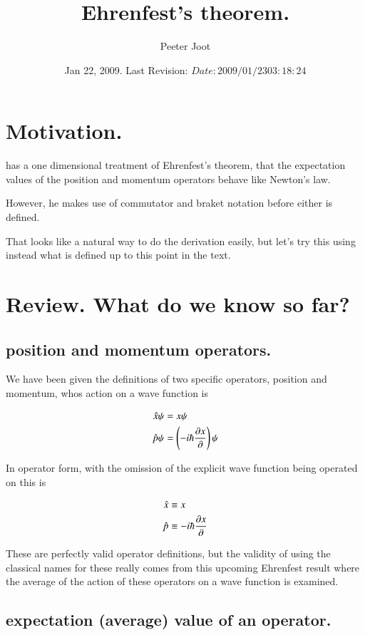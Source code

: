 \documentclass{article}
\title{ Ehrenfest's theorem. }
\author{Peeter Joot}
\date{ Jan 22, 2009.  Last Revision: $Date: 2009/01/23 03:18:24 $ }
\begin{document}
\maketitle{}

\section{ Motivation. }

\cite{mcmahon2005qmd} has a one dimensional treatment of Ehrenfest's theorem,
that the expectation values of the position and momentum operators behave
like Newton's law.

However, he makes use
of commutator and braket notation before either is defined.

That looks like a natural way to do the derivation easily, but let's try
this using instead what is defined up to this point in the text.

\section{ Review.  What do we know so far? }

\subsection{ position and momentum operators. }

We have been given the definitions of two specific operators, position and momentum, 
whos action on a wave function is

\begin{align*}
\hat{x} \psi &= x \psi \\
\hat{p} \psi &= \left(-i \hbar \frac{\partial{x}}{\partial {}}\right) \psi
\end{align*}

In operator form, with the omission of the explicit wave function being operated on this is

\begin{align*}
\hat{x} &\equiv x  \\
\hat{p} &\equiv -i \hbar \frac{\partial{x}}{\partial {}}
\end{align*}

These are perfectly valid operator definitions, but the validity of using the 
classical names for these really comes from this upcoming Ehrenfest result where
the average of the action of these operators on a wave function is examined.

\subsection{ expectation (average) value of an operator. }
\end{document}
